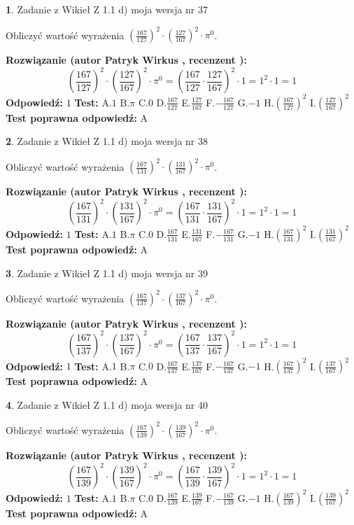 \documentclass[12pt, a4paper]{article}
\theoremstyle{definition} %
\newtheorem{zad}{}
\newcommand{\zadStart}[1]{\begin{zad}#1\newline}
\newcommand{\zadStop}{\end{zad}}
\newcommand{\rozwStart}[2]{\noindent \textbf{Rozwiązanie (autor #1 , recenzent #2): }\newline}
\newcommand{\rozwStop}{\newline}
\newcommand{\odpStart}{\noindent \textbf{Odpowiedź:}\newline}
\newcommand{\odpStop}{\newline}
\newcommand{\testStart}{\noindent \textbf{Test:}\newline}
\newcommand{\testStop}{\newline}
\newcommand{\kluczStart}{\noindent \textbf{Test poprawna odpowiedź:}\newline}
\newcommand{\kluczStop}{\newline}
\begin{document}
\zadStart{Zadanie z Wikieł Z 1.1 d) moja wersja nr 37}

Obliczyć wartość wyrażenia $(\frac{167}{127})^{2} \cdot (\frac{127}{167})^{2} \cdot \pi^{0}$.
\zadStop
\rozwStart{Patryk Wirkus}{}
$$(\frac{167}{127})^{2} \cdot (\frac{127}{167})^{2} \cdot \pi^{0} = (\frac{167}{127} \cdot \frac{127}{167})^{2} \cdot 1 = 1^{2} \cdot 1 = 1$$
\rozwStop
\odpStart
$1$
\odpStop
\testStart
A.$1$ B.$\pi$ C.$0$ D.$\frac{167}{127}$ E.$\frac{127}{167}$
F.$-\frac{167}{127}$ G.$-1$
H.$(\frac{167}{127})^{2}$
I.$(\frac{127}{167})^{2}$
\testStop
\kluczStart
A
\kluczStop



\zadStart{Zadanie z Wikieł Z 1.1 d) moja wersja nr 38}

Obliczyć wartość wyrażenia $(\frac{167}{131})^{2} \cdot (\frac{131}{167})^{2} \cdot \pi^{0}$.
\zadStop
\rozwStart{Patryk Wirkus}{}
$$(\frac{167}{131})^{2} \cdot (\frac{131}{167})^{2} \cdot \pi^{0} = (\frac{167}{131} \cdot \frac{131}{167})^{2} \cdot 1 = 1^{2} \cdot 1 = 1$$
\rozwStop
\odpStart
$1$
\odpStop
\testStart
A.$1$ B.$\pi$ C.$0$ D.$\frac{167}{131}$ E.$\frac{131}{167}$
F.$-\frac{167}{131}$ G.$-1$
H.$(\frac{167}{131})^{2}$
I.$(\frac{131}{167})^{2}$
\testStop
\kluczStart
A
\kluczStop



\zadStart{Zadanie z Wikieł Z 1.1 d) moja wersja nr 39}

Obliczyć wartość wyrażenia $(\frac{167}{137})^{2} \cdot (\frac{137}{167})^{2} \cdot \pi^{0}$.
\zadStop
\rozwStart{Patryk Wirkus}{}
$$(\frac{167}{137})^{2} \cdot (\frac{137}{167})^{2} \cdot \pi^{0} = (\frac{167}{137} \cdot \frac{137}{167})^{2} \cdot 1 = 1^{2} \cdot 1 = 1$$
\rozwStop
\odpStart
$1$
\odpStop
\testStart
A.$1$ B.$\pi$ C.$0$ D.$\frac{167}{137}$ E.$\frac{137}{167}$
F.$-\frac{167}{137}$ G.$-1$
H.$(\frac{167}{137})^{2}$
I.$(\frac{137}{167})^{2}$
\testStop
\kluczStart
A
\kluczStop



\zadStart{Zadanie z Wikieł Z 1.1 d) moja wersja nr 40}

Obliczyć wartość wyrażenia $(\frac{167}{139})^{2} \cdot (\frac{139}{167})^{2} \cdot \pi^{0}$.
\zadStop
\rozwStart{Patryk Wirkus}{}
$$(\frac{167}{139})^{2} \cdot (\frac{139}{167})^{2} \cdot \pi^{0} = (\frac{167}{139} \cdot \frac{139}{167})^{2} \cdot 1 = 1^{2} \cdot 1 = 1$$
\rozwStop
\odpStart
$1$
\odpStop
\testStart
A.$1$ B.$\pi$ C.$0$ D.$\frac{167}{139}$ E.$\frac{139}{167}$
F.$-\frac{167}{139}$ G.$-1$
H.$(\frac{167}{139})^{2}$
I.$(\frac{139}{167})^{2}$
\testStop
\kluczStart
A
\kluczStop
\end{document}
